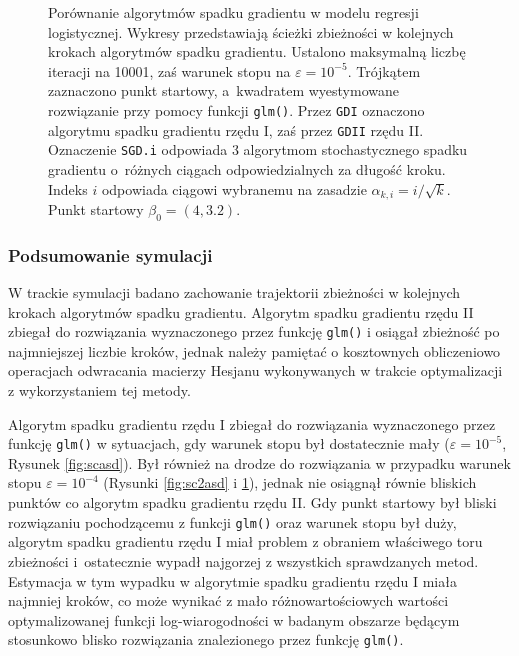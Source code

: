 \begin{figure}[hbt!]
  \caption[Porównanie algorytmów spadku gradientu dla punktu startowego $\beta_0 = (4,3.2)$.]{\label{fig:sc4asd}Porównanie algorytmów spadku gradientu w modelu regresji logistycznej. Wykresy przedstawiają ścieżki zbieżności w kolejnych krokach algorytmów spadku gradientu. Ustalono maksymalną liczbę iteracji na 10001, zaś warunek stopu na $\varepsilon=10^{-5}$. Trójkątem zaznaczono punkt startowy, a~kwadratem wyestymowane rozwiązanie przy pomocy funkcji \texttt{glm()}. Przez \texttt{GDI} oznaczono algorytmu spadku gradientu rzędu I, zaś przez \texttt{GDII} rzędu II. Oznaczenie \texttt{SGD.i} odpowiada 3 algorytmom stochastycznego spadku gradientu o~różnych ciągach odpowiedzialnych za długość kroku. Indeks $i$ odpowiada ciągowi wybranemu na zasadzie $\alpha_{k,i} = i/\sqrt{k}$. Punkt startowy $\beta_0 = (4,3.2)$.}
\end{figure}


\newpage

\subsubsection{Podsumowanie symulacji}
W trackie symulacji badano zachowanie trajektorii zbieżności w kolejnych krokach algorytmów spadku gradientu. Algorytm spadku gradientu rzędu II zbiegał do rozwiązania wyznaczonego przez funkcję \texttt{glm()} i osiągał zbieżność po najmniejszej liczbie kroków, jednak należy pamiętać o kosztownych obliczeniowo operacjach odwracania macierzy Hesjanu wykonywanych w trakcie optymalizacji z wykorzystaniem tej metody. 

Algorytm spadku gradientu rzędu I zbiegał do rozwiązania wyznaczonego przez funkcję \texttt{glm()} w sytuacjach, gdy warunek stopu był dostatecznie mały ($\varepsilon = 10^{-5}$, Rysunek \ref{fig:scasd}). Był również na drodze do rozwiązania w przypadku warunek stopu $\varepsilon = 10^{-4}$ (Rysunki \ref{fig:sc2asd} i \ref{fig:sc4asd}), jednak nie osiągnął równie bliskich punktów co algorytm spadku gradientu rzędu II. Gdy punkt startowy był bliski rozwiązaniu pochodzącemu z funkcji \texttt{glm()} oraz warunek stopu był duży, algorytm spadku gradientu rzędu I miał problem z obraniem właściwego toru zbieżności i~ostatecznie wypadł najgorzej z wszystkich sprawdzanych metod. Estymacja w tym wypadku w algorytmie spadku gradientu rzędu I miała najmniej kroków, co może wynikać z mało różnowartościowych wartości optymalizowanej funkcji log-wiarogodności w badanym obszarze będącym stosunkowo blisko rozwiązania znalezionego przez funkcję \texttt{glm()}.

